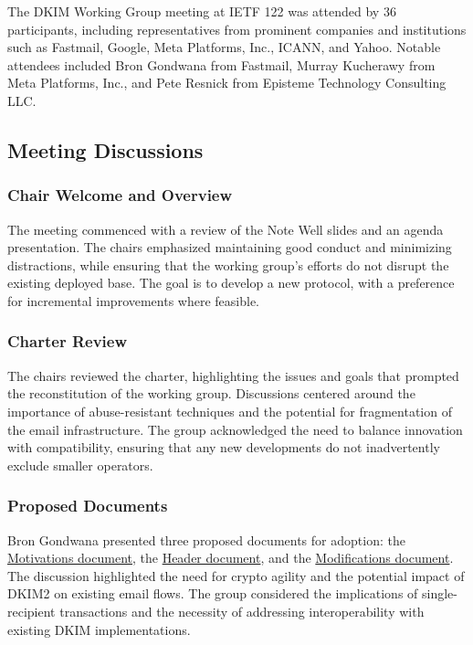 \documentclass{article}
\begin{document}
The DKIM Working Group meeting at IETF 122 was attended by 36 participants, including representatives from prominent companies and institutions such as Fastmail, Google, Meta Platforms, Inc., ICANN, and Yahoo. Notable attendees included Bron Gondwana from Fastmail, Murray Kucherawy from Meta Platforms, Inc., and Pete Resnick from Episteme Technology Consulting LLC.

\subsection{Meeting Discussions}

\subsubsection{Chair Welcome and Overview}

The meeting commenced with a review of the Note Well slides and an agenda presentation. The chairs emphasized maintaining good conduct and minimizing distractions, while ensuring that the working group's efforts do not disrupt the existing deployed base. The goal is to develop a new protocol, with a preference for incremental improvements where feasible.

\subsubsection{Charter Review}

The chairs reviewed the charter, highlighting the issues and goals that prompted the reconstitution of the working group. Discussions centered around the importance of abuse-resistant techniques and the potential for fragmentation of the email infrastructure. The group acknowledged the need to balance innovation with compatibility, ensuring that any new developments do not inadvertently exclude smaller operators.

\subsubsection{Proposed Documents}

Bron Gondwana presented three proposed documents for adoption: the \href{https://datatracker.ietf.org/doc/draft-gondwana-dkim2-motivation/}{Motivations document}, the \href{https://datatracker.ietf.org/doc/draft-gondwana-dkim2-header/}{Header document}, and the \href{https://datatracker.ietf.org/doc/draft-gondwana-dkim2-modification-alegbra/}{Modifications document}. The discussion highlighted the need for crypto agility and the potential impact of DKIM2 on existing email flows. The group considered the implications of single-recipient transactions and the necessity of addressing interoperability with existing DKIM implementations.
\end{document}
